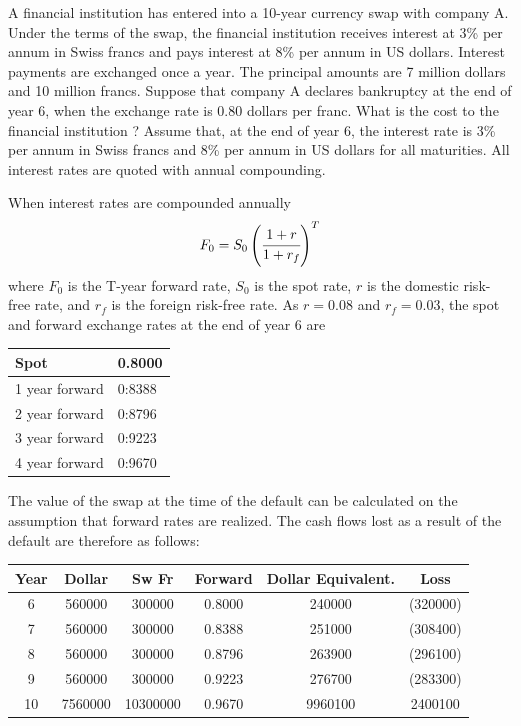 \documentclass[12pt,a4paper]{exam}
\begin{document}
\begin{questions}
\question A financial institution has entered into a 10-year currency swap with company A.
Under the terms of the swap, the financial institution receives interest at 3\% per annum in Swiss francs and pays interest at 8\% per annum in US dollars. Interest payments are exchanged once a year. The principal amounts are 7 million dollars and 10 million
francs. Suppose that company A declares bankruptcy at the end of year 6, when the exchange rate is 0.80 dollars per franc. What is the cost to the financial institution ? Assume that, at the end of year 6, the interest rate is 3\% per annum in Swiss francs and 8\%
per annum in US dollars for all maturities. All interest rates are quoted with annual compounding.

\begin{solution}
When interest rates are compounded annually
\begin{equation*}
	F_0 = S_0\left(\cfrac{1+r}{1+r_f}\right)^T
\end{equation*}
where $F_0$ is the T-year forward rate, $S_0$ is the spot rate, $r$ is the domestic risk-free rate, and $r_f$ is the foreign risk-free rate. As $r = 0.08$ and $r_f = 0.03$, the spot and forward
exchange rates at the end of year 6 are

\begin{center}
	\begin{tabular}{|l|l|}
		Spot & 0.8000 \\ \hline
1 year forward & 0:8388 \\ \hline
2 year forward & 0:8796 \\ \hline
3 year forward & 0:9223 \\ \hline
4 year forward & 0:9670 \\ \hline
	\end{tabular}
\end{center}

The value of the swap at the time of the default can be calculated on the assumption that forward rates are realized. The cash flows lost as a result of the default are therefore as follows:

\begin{center}
	\begin{tabular}{|c|c|c|c|c|c|}
Year & Dollar& Sw Fr & Forward &Dollar Equivalent. & Loss \\ \hline
6 &560000& 300000& 0.8000& 240000 & (320000) \\ \hline
7 &560000& 300000& 0.8388& 251000 & (308400) \\ \hline
8 &560000& 300000& 0.8796& 263900 & (296100) \\ \hline
9 &560000& 300000& 0.9223& 276700 & (283300) \\ \hline
10& 7560000& 10300000& 0.9670& 9960100 & 2400100 \\ \hline
	\end{tabular}
\end{center}


\end{solution}
\end{questions}
\end{document}
